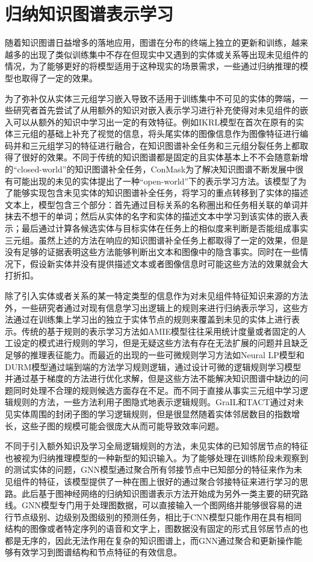 \section{归纳知识图谱表示学习}
随着知识图谱日益增多的落地应用，图谱在分布的终端上独立的更新和训练，越来越多的出现了类似训练集中不存在但现实中又遇到的实体或关系等出现未见组件的情况，为了能够更好的将模型适用于这种现实的场景需求，一些通过归纳推理的模型也取得了一定的效果。

为了弥补仅从实体三元组学习嵌入导致不适用于训练集中不可见的实体的弊端，一些研究者首先尝试了从用额外的知识对嵌入表示学习进行补充使得对未见组件的嵌入可以从额外的知识中学习出一定的有效特征。例如IKRL模型在首次在原有的实体三元组的基础上补充了视觉的信息，将头尾实体的图像信息作为图像特征进行编码并和三元组学习的特征进行融合，在知识图谱补全任务和三元组分裂任务上都取得了很好的效果。不同于传统的知识图谱都是固定的且实体基本上不不会随意新增的“closed-world”的知识图谱补全任务，ConMask\cite{shi2018open}为了解决知识图谱不断发展中很有可能出现的未见的实体提出了一种“open-world”下的表示学习方法。该模型了为了能够实现包含未见实体的知识图谱补全任务，将学习的重点转移到了实体的描述文本上，模型包含三个部分：首先通过目标关系的名称圈出和任务相关联的单词并抹去不想干的单词；然后从实体的名字和实体的描述文本中学习到该实体的嵌入表示；最后通过计算各候选实体与目标实体在任务上的相似度来判断是否能组成事实三元组。虽然上述的方法在响应的知识图谱补全任务上都取得了一定的效果，但是没有足够的证据表明这些方法能够判断出文本和图像中的隐含事实。同时在一些情况下，假设新实体并没有提供描述文本或者图像信息时可能这些方法的效果就会大打折扣。

除了引入实体或者关系的某一特定类型的信息作为对未见组件特征知识来源的方法外，一些研究者通过对现有信息学习出逻辑上的规则来进行归纳表示学习，这些方法通过在训练集上学习出的独立于实体节点的规则来覆盖到未见的实体上进行表示。传统的基于规则的表示学习方法如AMIE\cite{galarraga2013amie}模型往往采用统计度量或者固定的人工设定的模式进行规则的学习，但是无疑这些方法有存在无法扩展的问题并且缺乏足够的推理表征能力。而最近的出现的一些可微规则学习方法如Neural LP\cite{yang2017differentiable}模型和DURM\cite{sadeghian2019drum}模型通过端到端的方法学习规则逻辑，通过设计可微的逻辑规则学习模型并通过基于梯度的方法进行优化求解，但是这些方法不能解决知识图谱中缺边的问题同时处理不合理的规则候选方面存在不足。而不同于直接从事实三元组中学习逻辑规则的方法，一些方法利用子图隐式地表示逻辑规则。GraIL和TACT\cite{chen2021topology}通过对未见实体周围的封闭子图的学习逻辑规则，但是很显然随着实体邻居数目的指数增长，这些子图的规模可能会很庞大从而可能导致效率问题。

不同于引入额外知识及学习全局逻辑规则的方法，未见实体的已知邻居节点的特征也被视为归纳推理模型的一种新型的知识输入。为了能够处理在训练阶段未观察到的测试实体的问题，GNN模型通过聚合所有邻接节点中已知部分的特征来作为未见组件的特征，该模型提供了一种在图上很好的通过聚合邻接特征来进行学习的思路。此后基于图神经网络的归纳知识图谱表示方法开始成为另外一类主要的研究路线。GNN模型专门用于处理图数据，可以直接输入一个图网络并能够很容易的进行节点级别、边级别及图级别的预测任务，相比于CNN模型只能作用在具有相同结构的图像或者特定序列的语音和文字上，图数据没有固定的形式且邻居节点的也都是无序的，因此无法作用在复杂的知识图谱上，而GNN通过聚合和更新操作能够有效学习到图谱结构和节点特征的有效信息。

